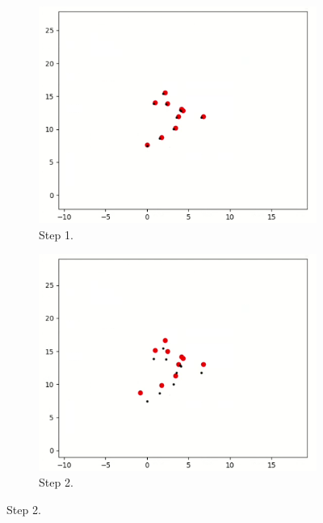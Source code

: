 \begin{figure}[!ht]
     \centering
     \begin{subfigure}[b]{0.28\textwidth}
         \centering
         \includegraphics[width=\textwidth]{figures/sequence_1.png}
         \caption{Step 1.}
         \label{fig:sequence_1}
     \end{subfigure}
     \hfill
     \begin{subfigure}[b]{0.28\textwidth}
         \centering
         \includegraphics[width=\textwidth]{figures/sequence_2.png}
         \caption{Step 2.}
         \label{fig:sequence_2}
     \end{subfigure}

\end{figure}
